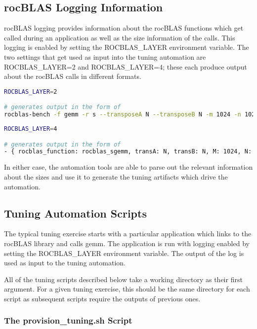 \documentclass[]{article}
\begin{document}
\subsection{rocBLAS Logging Information}

rocBLAS logging provides information about the rocBLAS functions which get called during an application as well as the size information of the calls. This logging is enabled by setting the ROCBLAS\_LAYER environment variable. The two settings that get used as input into the tuning automation are ROCBLAS\_LAYER=2 and ROCBLAS\_LAYER=4; these each produce output about the rocBLAS calls in different formats.

\begin{lstlisting}[language=bash,breaklines=true]
ROCBLAS_LAYER=2

# generates output in the form of
rocblas-bench -f gemm -r s --transposeA N --transposeB N -m 1024 -n 1024 -k 1024 --beta 0.0 --alpha 1.0 --lda 1024 --ldb 1024 --ldc 1024
\end{lstlisting}

\begin{lstlisting}[language=bash,breaklines=true]
ROCBLAS_LAYER=4

# generates output in the form of
- { rocblas_function: rocblas_sgemm, transA: N, transB: N, M: 1024, N: 1024, K: 1024, lda: 1024, ldb: 1024, ldc: 1024}
\end{lstlisting}

\noindent
In either case, the automation tools are able to parse out the relevant information about the sizes and use it to generate the tuning artifacts which drive the automation.

\subsection{Tuning Automation Scripts}

The typical tuning exercise starts with a particular application which links to the rocBLAS library and calls gemm. The application is run with logging enabled by setting the ROCBLAS\_LAYER environment variable. The output of the log is used as input to the tuning automation.

All of the tuning scripts described below take a working directory as their first argument. For a given tuning exercise, this should be the same directory for each script as subsequent scripts require the outputs of previous ones.

\subsubsection{The provision\_tuning.sh Script}
\end{document}
